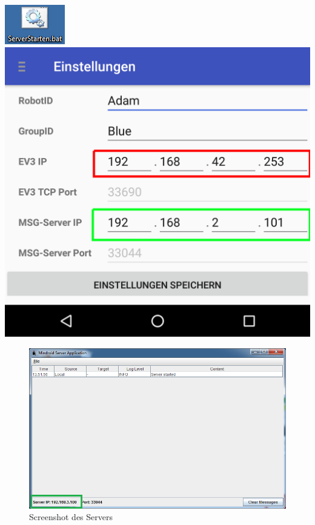 \documentclass[
	12pt,
	article,
	type=bsc, %
	colorbacktitle,
	instlogo,
	accentcolor=tud1c,
	draft,
	german,
	twoside
]{tudexercise}
\begin{document}
\begin{enumerate}
\begin{minipage}{.5\textwidth}
	\centering
	\includegraphics[width=.4\textwidth]{img/pc_serverbat.png}
	\includegraphics[width=.8\textwidth]{img/app_settings_short.png}
	\label{fig:app_settings}
	\end{minipage}
	\begin{center}
	\begin{figure}
	\includegraphics[width=.9\textwidth]{img/pc_server.png}
	\caption{Screenshot des Servers}
	\label{fig:server}
	\end{figure}
	
	\end{center}	

	
	
	\end{enumerate}
	
\end{document}
